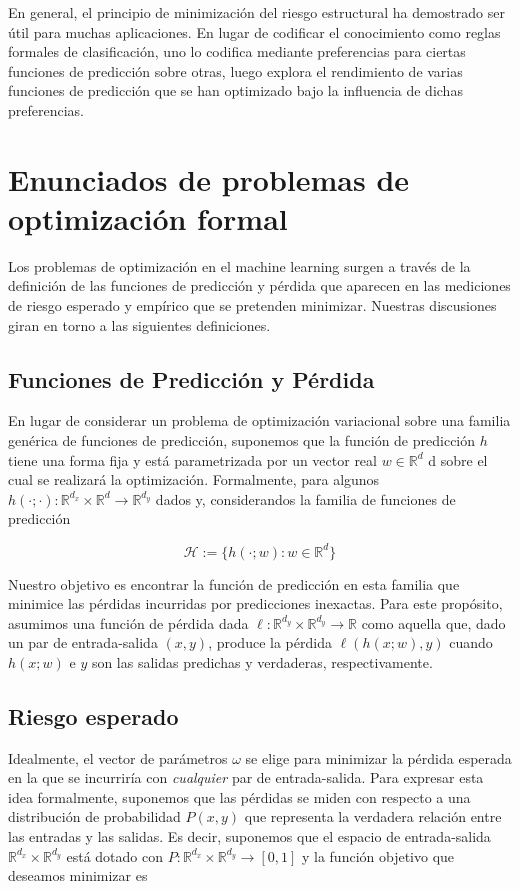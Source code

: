 En general, el principio de minimizaci\'on del riesgo estructural ha demostrado ser \'util para muchas aplicaciones. En lugar de codificar el conocimiento como reglas formales de clasificaci\'on, uno lo codifica mediante preferencias para ciertas funciones de predicci\'on sobre otras, luego explora el rendimiento de varias funciones de predicci\'on que se han optimizado bajo la influencia de dichas preferencias.

\section{Enunciados de problemas de optimizaci\'on formal}

Los problemas de optimizaci\'on en el machine learning surgen a trav\'es de la definici\'on de las funciones de predicci\'on y p\'erdida que aparecen en las mediciones de riesgo esperado y emp\'irico que se pretenden minimizar. Nuestras discusiones giran en torno a las siguientes definiciones.

\subsection{Funciones de Predicci\'on y P\'erdida}
En lugar de considerar un problema de optimizaci\'on variacional sobre una familia gen\'erica de funciones de predicci\'on, suponemos que la funci\'on de predicci\'on $h$ tiene una forma fija y est\'a parametrizada por un vector real $w \in \mathbb{R}^d $ d sobre el cual se realizar\'a la optimizaci\'on. Formalmente, para algunos $h(\cdot ; \cdot): \mathbb{R}^{d_x} \times \mathbb{R}^d \rightarrow \mathbb{R}^{d_y}$ dados y, considerandos la familia de funciones de predicci\'on

\begin{equation}
\mathcal{H} := \lbrace h(\cdot ; w): w \in \mathbb{R}^d \rbrace
\end{equation}

Nuestro objetivo es encontrar la funci\'on de predicci\'on en esta familia que minimice las p\'erdidas incurridas por predicciones inexactas. Para este prop\'osito, asumimos una funci\'on de p\'erdida dada $ \ell : \mathbb{R}^{d_y} \times \mathbb{R}^{d_y} \rightarrow \mathbb{R}$ como aquella que, dado un par de entrada-salida $(x, y)$, produce la p\'erdida $ \ell (h(x;w),y)$ cuando $h (x; w)$ e $y$ son las salidas predichas y verdaderas, respectivamente.

\subsection{Riesgo esperado}
Idealmente, el vector de par\'ametros $\omega$ se elige para minimizar la p\'erdida esperada en la que se incurrir\'ia con \textit{cualquier} par de entrada-salida. Para expresar esta idea formalmente, suponemos que las p\'erdidas se miden con respecto a una distribuci\'on de probabilidad $P (x, y)$ que representa la verdadera relaci\'on entre las entradas y las salidas. Es decir, suponemos que el espacio de entrada-salida $\mathbb{R}^{d_x} \times \mathbb{R}^{d_y}$ est\'a dotado con $P: \mathbb{R}^{d_x} \times \mathbb{R}^{d_y} \rightarrow [0,1]$ y la funci\'on objetivo que deseamos minimizar es

